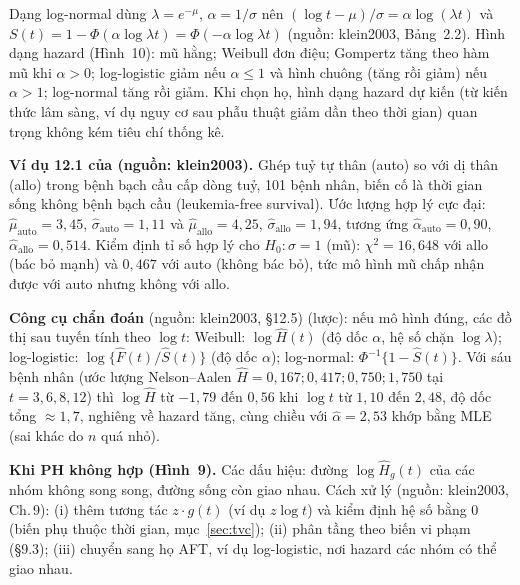 \documentclass[11pt,a4paper,notitlepage]{report}
\providecommand{\nguon}[1]{(nguồn: #1)}
\begin{document}
\begin{bosung}
Dạng log-normal dùng $\lambda=e^{-\mu}$, $\alpha=1/\sigma$ nên $(\log t-\mu)/\sigma=\alpha\log(\lambda t)$ và $S(t)=1-\Phi(\alpha\log\lambda t)=\Phi(-\alpha\log\lambda t)$ \nguon{klein2003, Bảng~2.2}.
Hình dạng hazard (Hình~10): mũ hằng; Weibull đơn điệu; Gompertz tăng theo hàm mũ khi $\alpha>0$; log-logistic giảm nếu $\alpha\le1$ và hình chuông (tăng rồi giảm) nếu $\alpha>1$;
log-normal tăng rồi giảm. Khi chọn họ, hình dạng hazard dự kiến (từ kiến thức lâm sàng, ví dụ nguy cơ sau phẫu thuật giảm dần theo thời gian) quan trọng không kém tiêu chí thống kê.
\end{bosung}

\begin{bosung}
\textbf{Ví dụ 12.1 của \nguon{klein2003}.} Ghép tuỷ tự thân (auto) so với dị thân (allo) trong bệnh bạch cầu cấp dòng tuỷ, 101 bệnh nhân, biến cố là thời gian sống không bệnh bạch cầu (leukemia-free survival).
Ước lượng hợp lý cực đại: $\hat\mu_{\mathrm{auto}}=3{,}45$, $\hat\sigma_{\mathrm{auto}}=1{,}11$ và $\hat\mu_{\mathrm{allo}}=4{,}25$, $\hat\sigma_{\mathrm{allo}}=1{,}94$, tương ứng
$\hat\alpha_{\mathrm{auto}}=0{,}90$, $\hat\alpha_{\mathrm{allo}}=0{,}514$. Kiểm định tỉ số hợp lý cho $H_0:\sigma=1$ (mũ): $\chi^2=16{,}648$ với allo (bác bỏ mạnh) và $0{,}467$ với auto (không bác bỏ),
tức mô hình mũ chấp nhận được với auto nhưng không với allo.

\textbf{Công cụ chẩn đoán} \nguon{klein2003, \S12.5} (lược): nếu mô hình đúng, các đồ thị sau tuyến tính theo $\log t$:
Weibull: $\log\hat H(t)$ (độ dốc $\alpha$, hệ số chặn $\log\lambda$); log-logistic: $\log\{\hat F(t)/\hat S(t)\}$ (độ dốc $\alpha$); log-normal: $\Phi^{-1}\{1-\hat S(t)\}$.
Với sáu bệnh nhân (ước lượng Nelson--Aalen $\hat H=0{,}167;0{,}417;0{,}750;1{,}750$ tại $t=3,6,8,12$) thì $\log\hat H$ từ $-1{,}79$ đến $0{,}56$ khi $\log t$ từ $1{,}10$ đến $2{,}48$, độ dốc tổng $\approx1{,}7$, nghiêng về hazard tăng, cùng chiều với $\hat\alpha=2{,}53$ khớp bằng MLE (sai khác do $n$ quá nhỏ).

\textbf{Khi PH không hợp (Hình~9).} Các dấu hiệu: đường $\log\hat H_g(t)$ của các nhóm không song song, đường sống còn giao nhau. Cách xử lý \nguon{klein2003, Ch.\,9}: (i) thêm tương tác $z\cdot g(t)$ (ví dụ $z\log t$) và kiểm định hệ số bằng 0
(biến phụ thuộc thời gian, mục~\ref{sec:tvc}); (ii) phân tầng theo biến vi phạm (\S9.3); (iii) chuyển sang họ AFT, ví dụ log-logistic, nơi hazard các nhóm có thể giao nhau.
\end{bosung}
\end{document}
